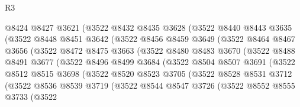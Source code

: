 \begin{lexlean}{R3}
\begin{coremodule}
                @8424
                @8427
                @3621
                (@3522
                  @8432
                  @8435
                  @3628
                  (@3522
                    @8440
                    @8443
                    @3635
                    (@3522
                      @8448
                      @8451
                      @3642
                      (@3522
                        @8456
                        @8459
                        @3649
                        (@3522
                          @8464
                          @8467
                          @3656
                          (@3522
                            @8472
                            @8475
                            @3663
                            (@3522
                              @8480
                              @8483
                              @3670
                              (@3522
                                @8488
                                @8491
                                @3677
                                (@3522
                                  @8496
                                  @8499
                                  @3684
                                  (@3522
                                    @8504
                                    @8507
                                    @3691
                                    (@3522
                                      @8512
                                      @8515
                                      @3698
                                      (@3522
                                        @8520
                                        @8523
                                        @3705
                                        (@3522
                                          @8528
                                          @8531
                                          @3712
                                          (@3522
                                            @8536
                                            @8539
                                            @3719
                                            (@3522
                                              @8544
                                              @8547
                                              @3726
                                              (@3522
                                                @8552
                                                @8555
                                                @3733
                                                (@3522

\end{coremodule}
\end{lexlean}
